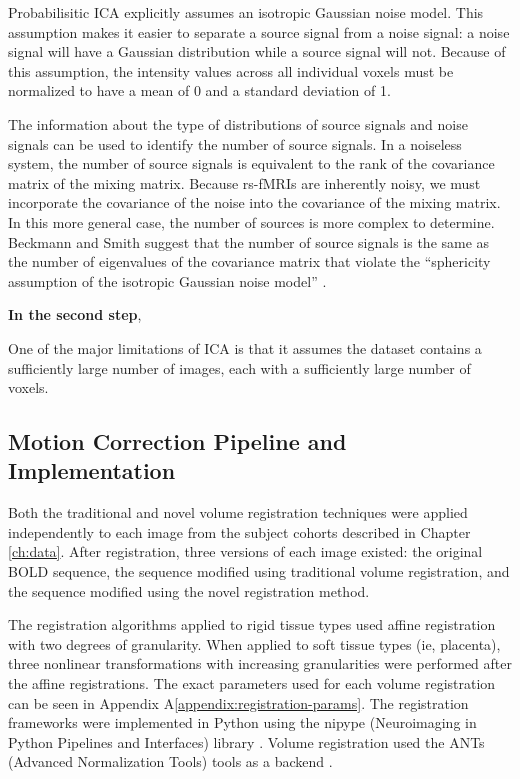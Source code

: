 Probabilisitic ICA explicitly assumes an isotropic Gaussian noise model. This assumption makes it easier to separate a source signal from a noise signal: a noise signal will have a Gaussian distribution while a source signal will not. Because of this assumption, the intensity values across all individual voxels must be normalized to have a mean of 0 and a standard deviation of 1.

The information about the type of distributions of source signals and noise signals can be used to identify the number of source signals. In a noiseless system, the number of source signals is equivalent to the rank of the covariance matrix of the mixing matrix. Because rs-fMRIs are inherently noisy, we must incorporate the covariance of the noise into the covariance of the mixing matrix. In this more general case, the number of sources is more complex to determine. Beckmann and Smith suggest that the number of source signals is the same as the number of eigenvalues of the covariance matrix that violate the ``sphericity assumption of the isotropic Gaussian noise model'' \cite{Beckmann2004}.

\textbf{In the second step}, 

One of the major limitations of ICA is that it assumes the dataset contains a sufficiently large number of images, each with a sufficiently large number of voxels.

  

\subsection{Motion Correction Pipeline and Implementation}

Both the traditional and novel volume registration techniques were applied independently to each image from the subject cohorts described in Chapter \ref{ch:data}. After registration, three versions of each image existed: the original BOLD sequence, the sequence modified using traditional volume registration, and the sequence modified using the novel registration method.

The registration algorithms applied to rigid tissue types used affine registration with two degrees of granularity. When applied to soft tissue types (ie, placenta),  three nonlinear transformations with increasing granularities were performed after the affine registrations. The exact parameters used for each volume registration can be seen in Appendix A\ref{appendix:registration-params}. The registration frameworks were implemented in Python using the nipype (Neuroimaging in Python Pipelines and Interfaces) library \cite{Gorgolewski2011}. Volume registration used the ANTs (Advanced Normalization Tools) tools as a backend \cite{Avants2014}.

